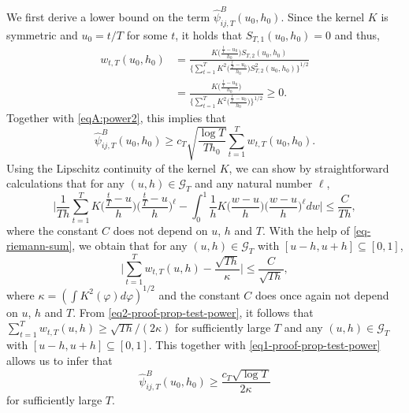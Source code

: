 We first derive a lower bound on the term $\widehat{\psi}_{ij, T}^B(u_0,h_0)$.  
Since the kernel $K$ is symmetric and $u_0 = t/T$ for some $t$, it holds that $S_{T,1}(u_0,h_0) = 0$ and thus,
\begin{align*} 
w_{t,T}(u_0,h_0) 
&= \frac{K\Big(\frac{\frac{t}{T}-u_0}{h_0}\Big) S_{T, 2}(u_0, h_0)}{\Big\{ \sum_{t=1}^T K^2\Big(\frac{\frac{t}{T}-u_0}{h_0}\Big)S^2_{T, 2}(u_0, h_0) \Big\}^{1/2}} \\
&=\frac{K\Big(\frac{\frac{t}{T}-u_0}{h_0}\Big)}{\Big\{ \sum_{t=1}^T K^2\Big(\frac{\frac{t}{T}-u_0}{h_0}\Big)\Big\}^{1/2}} \ge 0.
\end{align*}
Together with \eqref{eqA:power2}, this implies that 
\begin{equation}\label{eq1-proof-prop-test-power}
\widehat{\psi}_{ij, T}^B(u_0,h_0) \ge c_T \sqrt{\frac{\log T}{Th_0}} \sum\limits_{t=1}^T w_{t,T}(u_0,h_0).
\end{equation}
Using the Lipschitz continuity of the kernel $K$, we can show by straightforward calculations that for any $(u,h) \in \mathcal{G}_T$ and any natural number $\ell$, 
\begin{equation}\label{eq-riemann-sum}
\Big| \frac{1}{Th} \sum\limits_{t=1}^T K\Big(\frac{\frac{t}{T}-u}{h}\Big) \Big(\frac{\frac{t}{T}-u}{h}\Big)^\ell - \int_0^1 \frac{1}{h} K\Big(\frac{w-u}{h}\Big) \Big(\frac{w-u}{h}\Big)^\ell dw \Big| \le \frac{C}{Th}, 
\end{equation}
where the constant $C$ does not depend on $u$, $h$ and $T$. With the help of \eqref{eq-riemann-sum}, we obtain that for any $(u,h) \in \mathcal{G}_T$ with $[u-h,u+h] \subseteq [0,1]$, 
\begin{equation}\label{eq2-proof-prop-test-power}
\Big| \sum\limits_{t=1}^T w_{t,T}(u,h) - \frac{\sqrt{Th}}{\kappa} \Big| \le \frac{C}{\sqrt{Th}}, 
\end{equation}
where $\kappa = (\int K^2(\varphi)d\varphi)^{1/2}$ and the constant $C$ does once again not depend on $u$, $h$ and $T$. From \eqref{eq2-proof-prop-test-power}, it follows that $\sum\nolimits_{t=1}^T w_{t,T}(u,h) \ge \sqrt{Th} / (2\kappa)$ for sufficiently large $T$ and any $(u,h) \in \mathcal{G}_T$ with $[u-h,u+h] \subseteq [0,1]$. This together with \eqref{eq1-proof-prop-test-power} allows us to infer that 
\begin{equation}\label{eqA:power:psiB}
\widehat{\psi}_{ij, T}^B(u_0,h_0) \ge \frac{c_T \sqrt{\log T}}{2 \kappa} 
\end{equation}
for sufficiently large $T$. 


